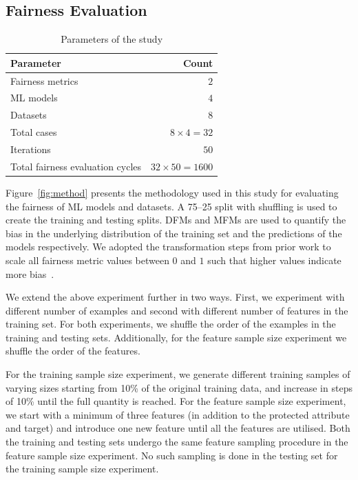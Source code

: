 \documentclass[sigconf,review]{acmart}
\begin{document}
\subsection{Fairness Evaluation}\label{sec:method-fair-eval}

\begin{table}
  \centering
  \caption{Parameters of the study}
  \begin{tabular}{l r}
    \hline
    \textbf{Parameter} & \textbf{Count}\\
    \hline
    Fairness metrics & $2$\\
    ML models & $4$\\
    Datasets & $8$\\
    Total cases & $8\times4=32$\\
    Iterations & $50$\\
    Total fairness evaluation cycles & $32\times50=1600$\\
    \hline
  \end{tabular}
  \label{tab:parameters}
\end{table}

Figure \ref{fig:method} presents the methodology used in this study
for evaluating the fairness of ML models and datasets. A 75--25 split
with shuffling is used to create the training and testing splits. DFMs
and MFMs are used to quantify the bias in the underlying distribution
of the training set and the predictions of the models respectively. We
adopted the transformation steps from prior work to scale all fairness
metric values between $0$ and $1$ such that higher values indicate
more bias \cite{zhang2021ignorance,hort2021fairea}.

We extend the above experiment further in two ways. First, we
experiment with different number of examples and second with different
number of features in the training set. For both experiments, we
shuffle the order of the examples in the training and testing sets.
Additionally, for the feature sample size experiment we shuffle the
order of the features.

For the training sample size experiment, we generate different
training samples of varying sizes starting from 10\% of the original
training data, and increase in steps of 10\% until the full quantity
is reached. For the feature sample size experiment, we start with
a minimum of three features (in addition to the protected attribute
and target) and introduce one new feature until all the features are
utilised. Both the training and testing sets undergo the same feature
sampling procedure in the feature sample size experiment. No such
sampling is done in the testing set for the training sample size
experiment.
\end{document}
